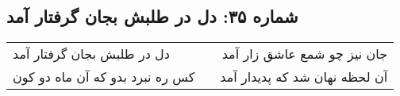 \begin{center}
\section*{شماره ۳۵: دل در طلبش بجان گرفتار آمد}
\label{sec:035}
\begin{longtable}{l p{0.5cm} r}
دل در طلبش بجان گرفتار آمد
&&
جان نیز چو شمع عاشق زار آمد
\\
کس ره نبرد بدو که آن ماه دو کون
&&
آن لحظه نهان شد که پدیدار آمد
\\
\end{longtable}
\end{center}
